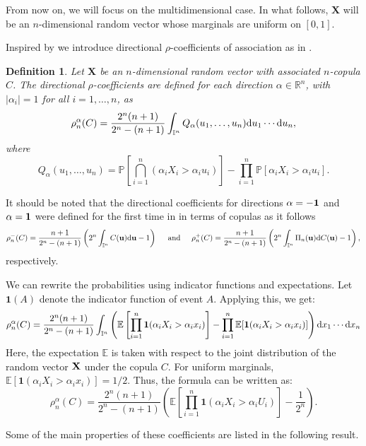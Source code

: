 \documentclass[11pt,a4paper]{article}
\newcommand{\I}{\mbox{${\rm I\!I}$}}
\newtheorem{definition}{Definition}
\def\XX{{\mathbf X}}
\def\uu{{\mathbf u}}
\def\I{{\mathbb I}}
\begin{document}
From now on, we will focus on the multidimensional case. In what follows, $\XX$ will be an $n$-dimensional random vector whose marginals are uniform on $[0,1]$.

Inspired by \cite{Ne96,Ne2011,Que2012} we introduce directional $\rho$-coefficients of association as in \cite{Gar2013}.

\begin{definition}
    Let $\XX$ be an $n$-dimensional random vector with associated $n$-copula $C$. The directional $\rho$-coefficients are defined for each direction $\alpha\in\mathbb{R}^n$, with $|\alpha_i|=1$ for all $i=1,\ldots,n$, as
\begin{equation}\label{def:rhoco}\rho_n^\alpha(C)=\frac{2^n(n+1)}{2^n-(n+1)}\int_{\I^n}Q_\alpha(u_1,\ldots,u_n){\rm d}u_1\cdots {\rm d}u_n,
\end{equation}
where $$Q_\alpha(u_1,\ldots,u_n)=\mathbb{P}\left[\bigcap_{i=1}^n(\alpha_iX_i>\alpha_iu_i)\right]-\prod_{i=1}^n\mathbb{P}[\alpha_iX_i>\alpha_iu_i].$$
\end{definition}

It should be noted that the directional coefficients for directions $\alpha={\bf -1}$ and $\alpha={\bf 1}$ were defined for the first time in \cite{Ne96} in terms of copulas as it follows 
$$\rho_n^-(C)=\frac{n+1}{2^n-(n+1)}\left(2^n\int_{\I^n}C(\uu){\rm d}\uu-1\right)\hspace{0.5cm}\text{and}\hspace{0.5cm}\rho_n^+(C)=\frac{n+1}{2^n-(n+1)}\left(2^n\int_{\I^n}\Pi_n(\uu){\rm d}C(\uu)-1\right),$$
respectively.

We can rewrite the probabilities using indicator functions and expectations. Let $\mathbf{1}(A)$ denote the indicator function of event $A$. Applying this, we get:
$$\rho_n^\alpha(C)=\frac{2^n(n+1)}{2^n-(n+1)}\int_{\mathbb{I}^n}\left(\mathbb{E}\left[\prod_{i=1}^n \mathbf{1}(\alpha_iX_i > \alpha_ix_i)\right]-\prod_{i=1}^n \mathbb{E}[\mathbf{1}(\alpha_iX_i > \alpha_ix_i)]\right){\rm d}x_1\cdots {\rm d}x_n$$
Here, the expectation $\mathbb{E}$ is taken with respect to the joint distribution of the random vector ${\bf X}$ under the copula $C$. For uniform marginals, $\mathbb{E}[\mathbf{1}(\alpha_iX_i > \alpha_ix_i)] = 1/2$. Thus, the formula can be written as:
$$\rho_n^\alpha(C)=\frac{2^n(n+1)}{2^n-(n+1)}\left( \mathbb{E}\left[\prod_{i=1}^n \mathbf{1}(\alpha_iX_i > \alpha_iU_i)\right] - \frac{1}{2^n} \right).$$


Some of the main properties of these coefficients are listed in the following result.
\end{document}
